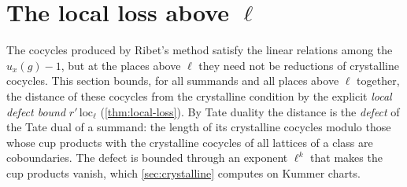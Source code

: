 \section{The local loss above \texorpdfstring{$\ell$}{l}}\label{sec:local-loss}

The cocycles produced by Ribet's method satisfy the linear relations among the $u_x(g)-1$, but at the places above $\ell$ they need not be reductions of crystalline
cocycles. This section bounds, for all summands and all places above $\ell$ together, the distance of these cocycles from the crystalline condition by the explicit
\emph{local defect bound} $r'\,\mathrm{loc}_\ell$ (\cref{thm:local-loss}). By Tate duality the distance is the \emph{defect} of the Tate dual of a summand: the length of its
crystalline cocycles modulo those whose cup products with the crystalline cocycles of all lattices of a class are coboundaries. The defect is bounded through an
exponent $\ell^k$ that makes the cup products vanish, which \cref{sec:crystalline} computes on Kummer charts.

